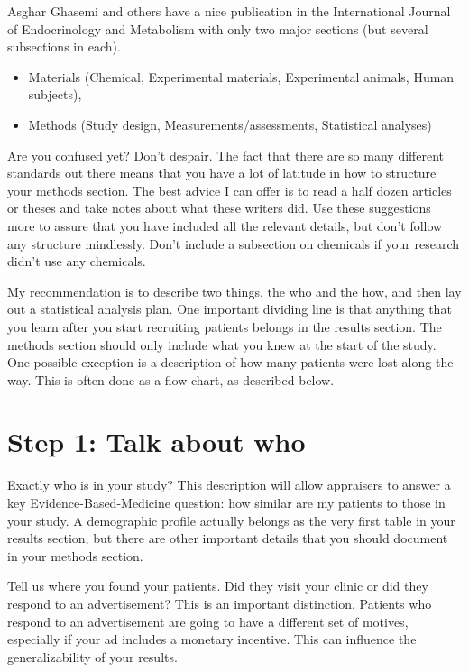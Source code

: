 \documentclass[
  letterpaper,
  DIV=11,
  numbers=noendperiod]{scrreprt}
\providecommand{\tightlist}{%
  \setlength{\itemsep}{0pt}\setlength{\parskip}{0pt}}
\begin{document}
\begin{tcolorbox}
Asghar Ghasemi and others have a nice publication in the International
Journal of Endocrinology and Metabolism with only two major sections
(but several subsections in each).

\begin{itemize}
\tightlist
\item
  Materials (Chemical, Experimental materials, Experimental animals,
  Human subjects),
\item
  Methods (Study design, Measurements/assessments, Statistical analyses)
\end{itemize}

Are you confused yet? Don't despair. The fact that there are so many
different standards out there means that you have a lot of latitude in
how to structure your methods section. The best advice I can offer is to
read a half dozen articles or theses and take notes about what these
writers did. Use these suggestions more to assure that you have included
all the relevant details, but don't follow any structure mindlessly.
Don't include a subsection on chemicals if your research didn't use any
chemicals.

My recommendation is to describe two things, the who and the how, and
then lay out a statistical analysis plan. One important dividing line is
that anything that you learn after you start recruiting patients belongs
in the results section. The methods section should only include what you
knew at the start of the study. One possible exception is a description
of how many patients were lost along the way. This is often done as a
flow chart, as described below.

\section{Step 1: Talk about who}\label{step-1-talk-about-who}

Exactly who is in your study? This description will allow appraisers to
answer a key Evidence-Based-Medicine question: how similar are my
patients to those in your study. A demographic profile actually belongs
as the very first table in your results section, but there are other
important details that you should document in your methods section.

Tell us where you found your patients. Did they visit your clinic or did
they respond to an advertisement? This is an important distinction.
Patients who respond to an advertisement are going to have a different
set of motives, especially if your ad includes a monetary incentive.
This can influence the generalizability of your results.


\end{tcolorbox}
\end{document}
